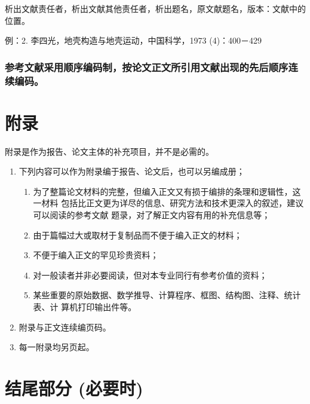 \documentclass[oneside, phd]{njuthesis}
\begin{document}
析出文献责任者，析出文献其他责任者，析出题名，原文献题名，版本：文献中的位置。

例：2. 李四光，地壳构造与地壳运动，中国科学，1973 (4)：400－429

\subsubsection{参考文献采用顺序编码制，按论文正文所引用文献出现的先后顺序连
续编码。}

\section{附录}

附录是作为报告、论文主体的补充项目，并不是必需的。

\begin{enumerate}
\item 下列内容可以作为附录编于报告、论文后，也可以另编成册；

\begin{enumerate}

\item 为了整篇论文材料的完整，但编入正文又有损于编排的条理和逻辑性，这一材料
包括比正文更为详尽的信息、研究方法和技术更深入的叙述，建议可以阅读的参考文献
题录，对了解正文内容有用的补充信息等；

\item 由于篇幅过大或取材于复制品而不便于编入正文的材料；

\item 不便于编入正文的罕见珍贵资料；

\item 对一般读者并非必要阅读，但对本专业同行有参考价值的资料；

\item 某些重要的原始数据、数学推导、计算程序、框图、结构图、注释、统计表、计
算机打印输出件等。

\end{enumerate}

\item 附录与正文连续编页码。

\item 每一附录均另页起。

\end{enumerate}

\section{结尾部分 (必要时)}
\end{document}
